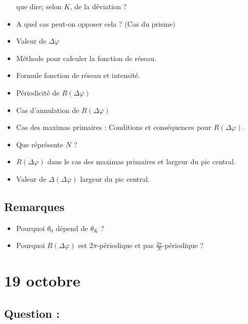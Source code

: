 \documentclass[a4paper, 11pt, hidelinks]{article}
\begin{document}
\begin{itemize}
    que dire; selon $K$, de la déviation ? \cite{Chapitre6}
    \item A quel cas peut-on opposer cela ? (Cas du prisme) \cite{Chapitre6}
    \item Valeur de $\Delta \varphi$ \cite{Chapitre6}
    \item Méthode pour calculer la fonction de réseau. \cite{Chapitre6} 
    \item Formule fonction de réseau et intensité. \cite{Chapitre6}
    \item Périodicité de $R(\Delta \varphi)$ \cite{Chapitre6}
    \item Cas d'annulation de $R(\Delta \varphi)$ \cite{Chapitre6}
    \item Cas des maximas primaires : Conditions et conséquences pour $R(\Delta \varphi)$. \cite{Chapitre6}
    \item Que réprésente $N$ ? \cite{Chapitre6}
    \item $R(\Delta \varphi)$ dans le cas des maximas primaires et largeur du pic central. \cite{Chapitre6}
    \item Valeur de $\Delta (\Delta \varphi)$ largeur du pic central. \cite{Chapitre6}
\end{itemize}



\subsection{Remarques}
\begin{itemize}
    \item Pourquoi $\theta_0$ dépend de $\theta_K$ ? \cite{Chapitre6}
    \item Pourquoi $R(\Delta \varphi)$ est $2\pi$-périodique et pas $\frac{2\pi}{N}$-périodique ? \cite{Chapitre6} 
\end{itemize}



\newpage

\section{19 octobre}


\subsection{Question :}
\end{document}
